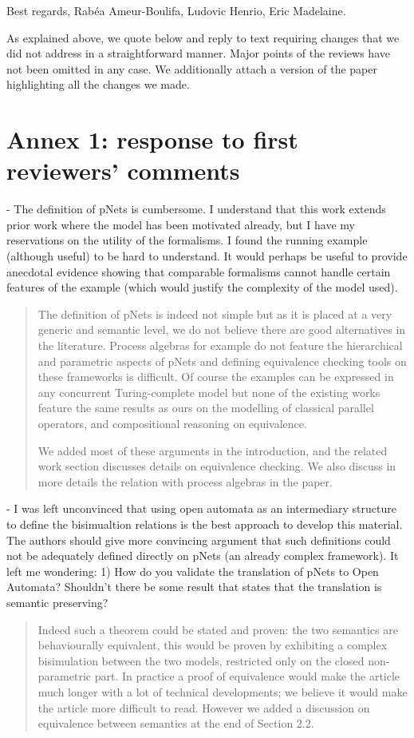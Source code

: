 \documentclass{article}
\begin{document}
\bigskip
\noindent
Best regards,
\newline
\noindent
Rab\'ea Ameur-Boulifa, Ludovic Henrio, Eric Madelaine.

\newpage
As explained above, we quote below and reply to text requiring changes that we did not 
address in a straightforward manner. Major points of the reviews have not been omitted in 
any case. We additionally attach a version of the paper highlighting all the changes we made.

\section*{Annex 1: response to first reviewers' comments}

- The definition of pNets is cumbersome. I understand that this work extends prior work where the model has been motivated already, but I have my reservations on the utility of the formalisms.    I found the running example (although useful) to be hard to understand.  It would perhaps be useful to provide anecdotal evidence showing that comparable formalisms cannot handle certain features of the example (which would justify the complexity of the model used).
\begin{quote}
The definition of pNets is indeed not simple but as it is placed at a very generic and semantic level, we do not believe there are good alternatives in the literature. Process algebras for example do not feature the hierarchical and parametric aspects of pNets and defining equivalence checking tools on these frameworks is difficult. Of course the examples can be expressed in any concurrent Turing-complete model but none of the existing works feature the same results as ours on the modelling of classical parallel operators, and compositional reasoning on equivalence.

We added most of these arguments in the introduction, and the related work section discusses details on equivalence checking. We also discuss in more details the relation with process algebras in the paper.
\end{quote}

- I was left unconvinced that using open automata as an intermediary structure to define the bisimualtion relations is the best approach to develop this material.  The authors should give more convincing argument that such definitions could not be adequately defined directly on pNets (an already complex framework).  It left me wondering:
1) How do you validate the translation of pNets to Open Automata?  Shouldn't there be some result that states that the translation is semantic preserving?   
\begin{quote}
Indeed such a theorem could be stated and proven: the two semantics are behaviourally equivalent, this would be proven by exhibiting a complex bisimulation between the two models, restricted only on the closed non-parametric part. In practice a proof of equivalence would make the article much longer with a lot of technical developments; we believe it would make the article more difficult to read. However we added a discussion on equivalence between semantics at the end of Section 2.2.
\end{quote}
 
\end{document}
